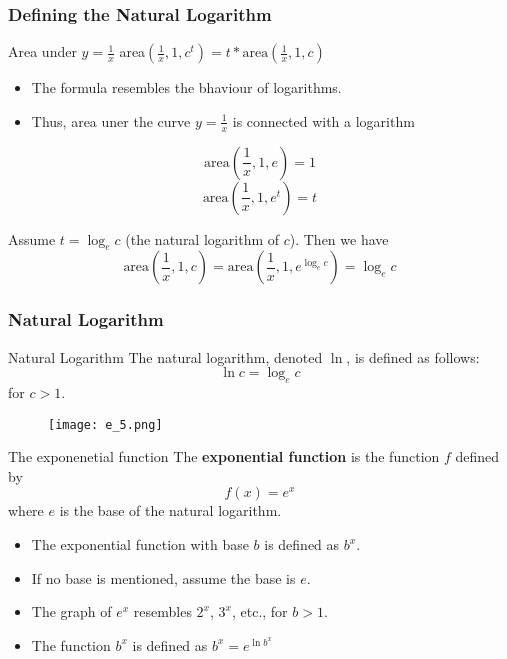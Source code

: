 \begin{frame}
  \frametitle{Defining the Natural Logarithm}
  \begin{block}{Area under \(y = \frac{1}{x}\)}
      area\((\frac{1}{x},1,c^{t}) = t*\text{area}(\frac{1}{x},1,c) \)
  \end{block}
  \begin{itemize}
    \item The formula resembles the bhaviour of logarithms.
    \item Thus, area uner the curve \(y = \frac{1}{x}\) is connected with a logarithm
  \end{itemize}
  \[\text{area}(\frac{1}{x},1,e) = 1 \]
\[\text{area}(\frac{1}{x},1,e^{t}) = t \]

Assume \(t = \log_e c\) (the natural logarithm of \(c\)). Then we have
\[\text{area}(\frac{1}{x},1,c) = \text{area}(\frac{1}{x},1,e^{\log_e c}) = \log_e c\]  
\end{frame}


\begin{frame}
  \frametitle{Natural Logarithm}
  
      \begin{block}{Natural Logarithm}
        The natural logarithm, denoted \(\ln\), is defined as follows:
        \[
          \ln c = \log_e c
        \]
        for \(c > 1\).
      \end{block}
      \begin{figure}
        \centering
        \texttt{[image: e\_5.png]}
      \end{figure}
\end{frame}

\begin{frame}
  \begin{block}{The exponenetial function}
    The \textbf{exponential function} is the function \(f\) defined by 
    \[ f(x) = e^{x} \]
    where \(e\) is the base of the natural logarithm.
  \end{block}
        \begin{itemize}
            \item The exponential function with base \( b \) is defined as \( b^x \).
            \item If no base is mentioned, assume the base is \( e \).
            \item The graph of \( e^x \) resembles \( 2^x \), \( 3^x \), etc., for \( b > 1 \).
            \item The function \(b^{x}\) is defined as \( b^{x} = e^{\ln b^{x}} \)
        \end{itemize}
\end{frame}